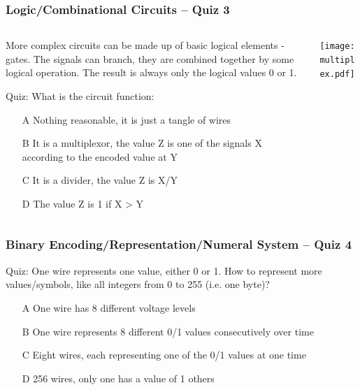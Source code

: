 \documentclass{beamer}
\begin{document}
\begin{frame}
\frametitle{Logic/Combinational Circuits -- Quiz 3}

\begin{columns}
\begin{column}{0.55\textwidth}

More complex circuits can be made up of basic logical elements - gates. The signals can branch, they are combined together by some logical operation. The result is always only the logical values 0 or 1.

\bigskip

Quiz: What is the circuit function:
\begin{itemize}
\item[A] Nothing reasonable, it is just a tangle of wires
\item[B] It is a multiplexor, the value Z is one of the signals X according to the encoded value at Y
\item[C] It is a divider, the value Z is X/Y
\item[D] The value Z is 1 if X > Y
\end{itemize}
\end{column}
\begin{column}{0.45\textwidth}
\begin{center}
   \texttt{[image: multiplex.pdf]}
\end{center}
\end{column}
\end{columns}


\end{frame}


\begin{frame}
\frametitle{Binary Encoding/Representation/Numeral System -- Quiz 4}

Quiz: One wire represents one value, either 0 or 1. How to represent more values/symbols, like all integers from 0 to 255 (i.e. one byte)?
\begin{itemize}
\item[A] One wire has 8 different voltage levels
\item[B] One wire represents 8 different 0/1 values consecutively over time
\item[C] Eight wires, each representing one of the 0/1 values at one time
\item[D] 256 wires, only one has a value of 1 others
\end{itemize}

\end{frame}
\end{document}

